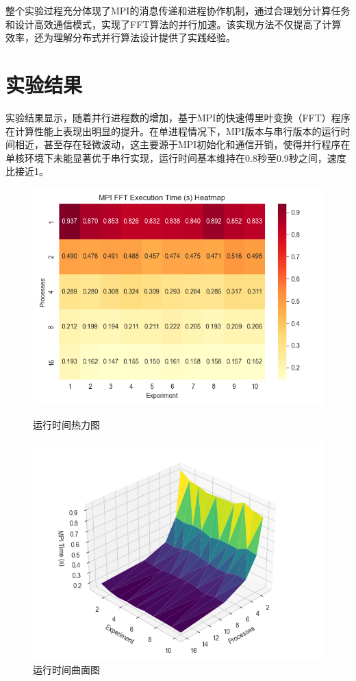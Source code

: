 \documentclass[a4paper, utf8]{ctexart}
\begin{document}
	整个实验过程充分体现了MPI的消息传递和进程协作机制，通过合理划分计算任务和设计高效通信模式，实现了FFT算法的并行加速。该实现方法不仅提高了计算效率，还为理解分布式并行算法设计提供了实践经验。
	
	\section{实验结果}
	
	实验结果显示，随着并行进程数的增加，基于MPI的快速傅里叶变换（FFT）程序在计算性能上表现出明显的提升。在单进程情况下，MPI版本与串行版本的运行时间相近，甚至存在轻微波动，这主要源于MPI初始化和通信开销，使得并行程序在单核环境下未能显著优于串行实现，运行时间基本维持在0.8秒至0.9秒之间，速度比接近1。
	
	\begin{figure}[htbp]
		\centering
		\begin{minipage}{.45\textwidth}
			\centering
			\includegraphics[width=.8\textwidth]{./figure/TimeHeatmap.png}
			\caption{运行时间热力图}
		\end{minipage}
		\begin{minipage}{.45\textwidth}
			\centering
			\includegraphics[width=.8\textwidth]{./figure/TimeLandscape.png}
			\caption{运行时间曲面图}
		\end{minipage}
	\end{figure}
	
\end{document}
